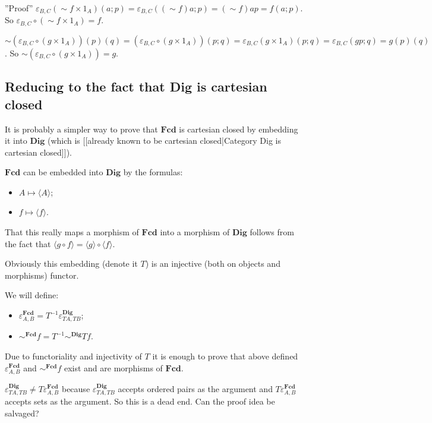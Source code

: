 ''Proof'' $\varepsilon_{B, C} ( \sim f \times 1_{A}) ( a ; p) = \varepsilon_{B, C} ( ( \sim f) a ; p) = ( \sim f) a p = f ( a ; p)$. So $\varepsilon_{B, C} \circ ( \sim f \times 1_{A}) = f$.

  $\sim ( \varepsilon_{B, C} \circ ( g \times 1_{A})) ( p) ( q) = ( \varepsilon_{B, C} \circ ( g \times 1_{A})) ( p ; q) = \varepsilon_{B, C} ( g \times 1_{A}) ( p ; q) = \varepsilon_{B, C} ( g p ; q) = g ( p) ( q)$. So $\sim ( \varepsilon_{B, C} \circ ( g \times 1_{A})) = g$.

\subsection{Reducing to the fact that Dig is cartesian closed}
It is probably a simpler way to prove that $\mathbf{Fcd}$ is cartesian closed by embedding it into $\mathbf{Dig}$ (which is [[already known to be cartesian closed|Category Dig is cartesian closed]]).

$\mathbf{Fcd}$ can be embedded into $\mathbf{Dig}$ by the formulas:
\begin{itemize}
\item $A \mapsto \langle A \rangle$;
\item $f \mapsto \langle f \rangle$.
\end{itemize}

That this really maps a morphism of $\mathbf{Fcd}$ into a morphism of $\mathbf{Dig}$ follows from the fact that $\langle g\circ f\rangle = \langle g\rangle\circ\langle f\rangle$.

Obviously this embedding (denote it $T$) is an injective (both on objects and morphisms) functor.

We will define:
\begin{itemize}
\item $\varepsilon^{\mathbf{Fcd}}_{A, B} = T^{-1} \varepsilon^{\mathbf{Dig}}_{T A, T B}$;
\item $\sim^{\mathbf{Fcd}} f = T^{-1} \sim^{\mathbf{Dig}} T f$.
\end{itemize}

Due to functoriality and injectivity of $T$ it is enough to prove that above defined $\varepsilon^{\mathbf{Fcd}}_{A, B}$ and $\sim^{\mathbf{Fcd}} f$ exist and are morphisms of $\mathbf{Fcd}$.

$\varepsilon^{\mathbf{Dig}}_{T A, T B} \ne T\varepsilon^{\mathbf{Fcd}}_{A, B}$ because $\varepsilon^{\mathbf{Dig}}_{T A, T B}$ accepts ordered pairs as the argument and $T \varepsilon^{\mathbf{Fcd}}_{A, B}$ accepts sets as the argument. So this is a dead end. Can the proof idea be salvaged?

